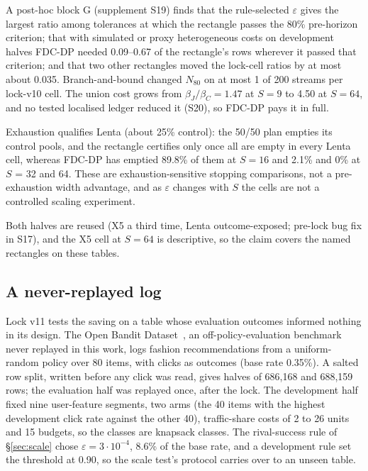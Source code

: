 \documentclass[sigconf,anonymous,review]{acmart}
\newcommand{\eps}{\varepsilon}
\begin{document}
A post-hoc block G (supplement S19) finds that the rule-selected $\eps$ gives the largest ratio among tolerances at which the rectangle passes the 80\% pre-horizon criterion; that with simulated or proxy heterogeneous costs on development halves FDC-DP needed 0.09--0.67 of the rectangle's rows wherever it passed that criterion; and that two other rectangles moved the lock-cell ratios by at most about 0.035. Branch-and-bound changed $N_{80}$ on at most 1 of 200 streams per lock-v10 cell. The union cost grows from $\beta_J/\beta_C = 1.47$ at $S = 9$ to 4.50 at $S = 64$, and no tested localised ledger reduced it (S20), so FDC-DP pays it in full.

Exhaustion qualifies Lenta (about 25\% control): the 50/50 plan empties its control pools, and the rectangle certifies only once all are empty in every Lenta cell, whereas FDC-DP has emptied 89.8\% of them at $S = 16$ and 2.1\% and 0\% at $S$ = 32 and 64. These are exhaustion-sensitive stopping comparisons, not a pre-exhaustion width advantage, and as $\eps$ changes with $S$ the cells are not a controlled scaling experiment.

Both halves are reused (X5 a third time, Lenta outcome-exposed; pre-lock bug fix in S17), and the X5 cell at $S = 64$ is descriptive, so the claim covers the named rectangles on these tables.

\begin{table}[t]
\caption{\textbf{Decision difficulty} (post hoc). Share: mean share of feasible policies that are $\eps$-optimal; Ctrl: problems where all-control is (development halves). Hor./Exh.: evaluation streams of 200 where primary/rival missed 12 of 15 before $\tau_R$ / had an empty pool at $N_{80}$ (n.r.: not recorded). $^\ddagger$$S$ = 16, 32, 64. $^*$Bracket. $^\dagger$Descriptive. Details: S25.}
\label{tab:difficulty}

\end{table}

\subsection{A never-replayed log}\label{sec:obd}

Lock v11 tests the saving on a table whose evaluation outcomes informed nothing in its design. The Open Bandit Dataset~\citep{saito2021open}, an off-policy-evaluation benchmark never replayed in this work, logs fashion recommendations from a uniform-random policy over 80 items, with clicks as outcomes (base rate 0.35\%). A salted row split, written before any click was read, gives halves of 686,168 and 688,159 rows; the evaluation half was replayed once, after the lock. The development half fixed nine user-feature segments, two arms (the 40 items with the highest development click rate against the other 40), traffic-share costs of 2 to 26 units and 15 budgets, so the classes are knapsack classes. The rival-success rule of \S\ref{sec:scale} chose $\eps = 3 \cdot 10^{-4}$, 8.6\% of the base rate, and a development rule set the threshold at 0.90, so the scale test's protocol carries over to an unseen table.
\end{document}

